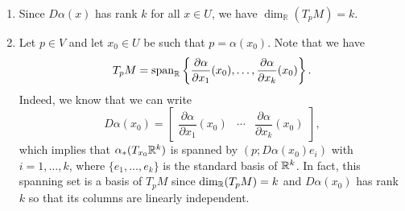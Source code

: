 \begin{enumerate}[(1)]
    \item Since $D\alpha(x)$ has rank $k$ for all $x \in U$, we have 
    $\dim_{\mathbb{R}}(T_pM) = k$. 

    \item Let $p \in V$ and let $x_0 \in U$ be such that $p = \alpha(x_0)$. 
    Note that we have 
    \[ T_pM = \operatorname{span}_{\mathbb{R}}\left\{ \frac{\partial\alpha}{\partial x_1}(x_0), 
    \dots, \frac{\partial\alpha}{\partial x_k}(x_0) \right\}. \] 
    Indeed, we know that we can write 
    \[ D\alpha(x_0) = \left[ \begin{array}{c|c|c}
        \!\!\! \dfrac{\partial\alpha}{\partial x_1}(x_0) & \cdots & 
        \dfrac{\partial\alpha}{\partial x_k}(x_0)\!\!\! 
    \end{array} \right]\!, \] 
    which implies that $\alpha_*(T_{x_0}\mathbb{R}^k)$ is spanned by 
    $(p; D\alpha(x_0)e_i)$ with $i = 1, \dots, k$, where $\{e_1, \dots, e_k\}$ 
    is the standard basis of $\mathbb{R}^k$. In fact, this spanning set is 
    a basis of $T_pM$ since $\dim_{\mathbb{R}}(T_pM) = k$ and $D\alpha(x_0)$ has rank 
    $k$ so that its columns are linearly independent. 


\end{enumerate}
